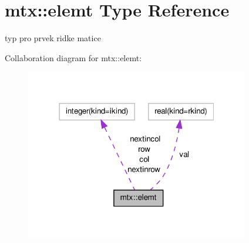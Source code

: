 \hypertarget{structmtx_1_1elemt}{\section{mtx\-:\-:elemt \-Type \-Reference}
\label{structmtx_1_1elemt}
}


typ pro prvek ridke matice  




\-Collaboration diagram for mtx\-:\-:elemt\-:\nopagebreak
\begin{figure}[H]
\begin{center}
\leavevmode
\includegraphics[width=276pt]{structmtx_1_1elemt__coll__graph}
\end{center}
\end{figure}
